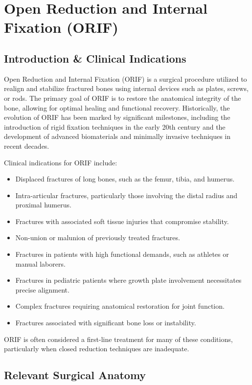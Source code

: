 \chapter{Open Reduction and Internal Fixation (ORIF)}

\section*{Introduction \& Clinical Indications}

Open Reduction and Internal Fixation (ORIF) is a surgical procedure utilized to realign and stabilize fractured bones using internal devices such as plates, screws, or rods. The primary goal of ORIF is to restore the anatomical integrity of the bone, allowing for optimal healing and functional recovery. Historically, the evolution of ORIF has been marked by significant milestones, including the introduction of rigid fixation techniques in the early 20th century and the development of advanced biomaterials and minimally invasive techniques in recent decades.

Clinical indications for ORIF include:

\begin{itemize}
  \item Displaced fractures of long bones, such as the femur, tibia, and humerus.
  \item Intra-articular fractures, particularly those involving the distal radius and proximal humerus.
  \item Fractures with associated soft tissue injuries that compromise stability.
  \item Non-union or malunion of previously treated fractures.
  \item Fractures in patients with high functional demands, such as athletes or manual laborers.
  \item Fractures in pediatric patients where growth plate involvement necessitates precise alignment.
  \item Complex fractures requiring anatomical restoration for joint function.
  \item Fractures associated with significant bone loss or instability.
\end{itemize}

ORIF is often considered a first-line treatment for many of these conditions, particularly when closed reduction techniques are inadequate.

\section*{Relevant Surgical Anatomy}

